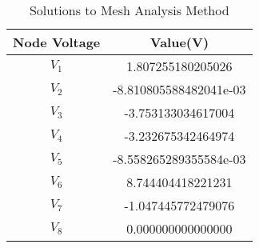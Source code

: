 \begin{table}[h]


\label{tab:tables}
\begin{center}
\begin{tabular}{|c|c|} 
 \hline
 
  Node Voltage & Value\hspace{1mm}(V)\\
 \hline
 $V_{1}$ & 1.807255180205026 \\
  \hline   
 $V_{2}$ & -8.810805588482041e-03\\
  \hline
 $V_{3}$ & -3.753133034617004\\
  \hline
 $V_{4}$ & -3.232675342464974\\
  \hline
 $V_{5}$ & -8.558265289355584e-03\\ 
  \hline
 $V_{6}$ & 8.744404418221231\\
  \hline
 $V_{7}$ & -1.047445772479076\\
  \hline
 $V_{8}$ & 0.000000000000000 \\
    
 
 \hline
\end{tabular}
\caption{Solutions to Mesh Analysis Method}
\label{table:tab2}
\end{center}
\end{table}










